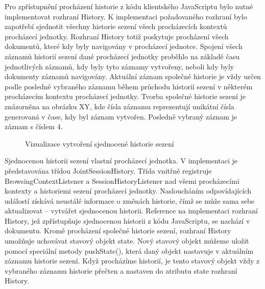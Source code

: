 Pro zpřístupnění procházení historie z kódu klientského JavaScriptu bylo nutné implementovat rozhraní History. K implementaci požadovaného rozhraní bylo zapotřebí sjednotit všechny historie sezení všech procházecích kontextů procházecí jednotky. Rozhraní History totiž poskytuje procházení všech dokumentů, které kdy byly navigovány v procházecí jednotce. Spojení všech záznamů historií sezení dané procházecí jednotky proběhlo na základě času jednotlivých záznamů, kdy byly tyto záznamy vytvořeny, neboli kdy byly dokumenty záznamů navigovány. Aktuální záznam společné historie je vždy určen podle posledně vybraného záznamu během průchodu historií sezení v některém procházecím kontextu procházecí jednotky. Tvorba společné historie sezení je znázorněna na obrázku XY, kde čísla záznamu reprezentují unikátní čísla generovaná v čase, kdy byl záznam vytvořen. Posledně vybraný záznam je záznam s číslem 4.

\begin{figure}[H]
  \begin{center}
    \caption{Vizualizace vytvoření sjednocené historie sezení}
    \label{Figure.SessionHistory}
  \end{center}
\end{figure}

Sjednocenou historii sezení vlastní procházecí jednotka. V implementaci je představována třídou JointSessionHistory. Třída vnitřně registruje BrowsingContextListener a SessionHistoryListener nad všemi procházecími kontexty a historiemi sezení procházecí jednotky. Nasloucháním odpovídajících událostí získává neustálé informace o změnách historie, čímž se může sama sebe aktualizovat – vytvářet sjednocenou historii. Reference na implementaci rozhraní History, jež zpřístupňuje sjednocenou historii z kódu JavaScriptu, se nachází v dokumentu. Kromě procházení společné historie sezení, rozhraní History umožňuje uchovávat stavový objekt state. Nový stavový objekt můžeme uložit pomocí speciální metody pushState(), která daný objekt nastavuje v aktuálním záznamu historie sezení. Když procházíme historií, je tento stavový objekt vždy z vybraného záznamu historie přečten a nastaven do atributu state rozhraní History.

